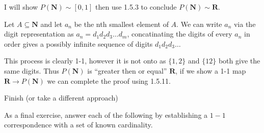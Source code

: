 \begin{solution}
  I will show $P(\mathbf N) \sim [0, 1]$ then use 1.5.3 to conclude $P(\mathbf N) \sim \mathbf R$.

  Let $A \subseteq \mathbf N$ and let $a_n$ be the nth smallest element of $A$.
  We can write $a_n$ via the digit representation as $a_n = d_1d_2d_3\dots d_m$, concatinating the digits of every $a_n$ in order gives a possibly infinite sequence of digits $d_1d_2d_3\dots$

  This process is clearly 1-1, however it is not onto as $\{1, 2\}$ and $\{12\}$ both give the same digits. Thus $P(\mathbf N)$ is ``greater then or equal'' $\mathbf{R}$, if we show a 1-1 map $\mathbf R \to P(\mathbf{N})$ we can complete the proof using 1.5.11.

  \TODO Finish (or take a different approach)
\end{solution}

\begin{exercise}
  As a final exercise, answer each of the following by establishing a $1-1$ correspondence with a set of known cardinality.
\end{exercise}

\begin{solution}
\end{solution}

